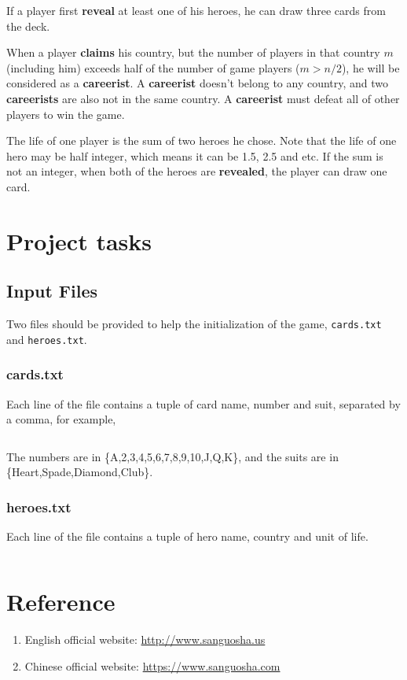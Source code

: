 \documentclass[11pt,a4paper]{article}
\begin{document}
If a player first \textbf{reveal} at least one of his heroes, he can draw three cards from the deck. \bigskip

When a player \textbf{claims} his country, but the number of players in that country $m$ (including him) exceeds half of the number of game players ($m>n/2$), he will be considered as a \textbf{careerist}. A \textbf{careerist} doesn't belong to any country, and two \textbf{careerists} are also not in the same country. A \textbf{careerist} must defeat all of other players to win the game. \bigskip

The life of one player is the sum of two heroes he chose. Note that the life of one hero may be half integer, which means it can be 1.5, 2.5 and etc. If the sum is not an integer, when both of the heroes are \textbf{revealed}, the player can draw one card.

\section{Project tasks}

\subsection{Input Files}

Two files should be provided to help the initialization of the game, \texttt{cards.txt} and \texttt{heroes.txt}.

\subsubsection{cards.txt}
Each line of the file contains a tuple of card name, number and suit, separated by a comma, for example,
\inputminted{shell}{cards.txt}

The numbers are in \{A,2,3,4,5,6,7,8,9,10,J,Q,K\}, and the suits are in \{Heart,Spade,Diamond,Club\}.

\subsubsection{heroes.txt}
Each line of the file contains a tuple of hero name, country and unit of life. 
\inputminted{shell}{heroes.txt}




\section{Reference}
\begin{enumerate}
\item English official website: \url{http://www.sanguosha.us}
\item Chinese official website: \url{https://www.sanguosha.com}
\end{enumerate}
\end{document}
